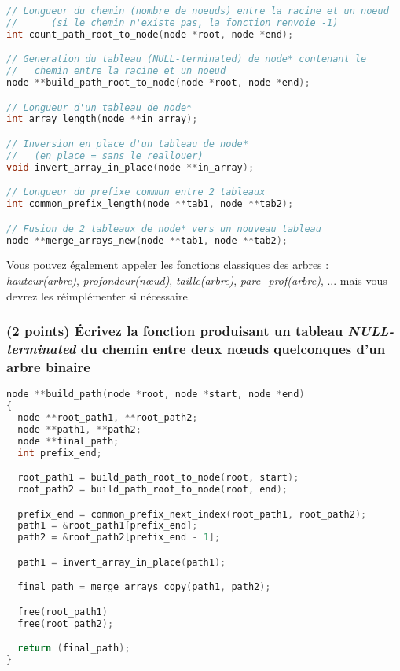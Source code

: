 \documentclass[11pt,a4paper]{article}
\begin{document}
\begin{center}
\begin{lstlisting}[language=C,commentstyle=\color{teal}\ttfamily,morekeywords={node}]
// Longueur du chemin (nombre de noeuds) entre la racine et un noeud
//      (si le chemin n'existe pas, la fonction renvoie -1)
int count_path_root_to_node(node *root, node *end);

// Generation du tableau (NULL-terminated) de node* contenant le
//   chemin entre la racine et un noeud
node **build_path_root_to_node(node *root, node *end);

// Longueur d'un tableau de node*
int array_length(node **in_array);

// Inversion en place d'un tableau de node*
//   (en place = sans le reallouer)
void invert_array_in_place(node **in_array);

// Longueur du prefixe commun entre 2 tableaux
int common_prefix_length(node **tab1, node **tab2);

// Fusion de 2 tableaux de node* vers un nouveau tableau
node **merge_arrays_new(node **tab1, node **tab2);
\end{lstlisting}
\end{center}


\noindent Vous pouvez également appeler les fonctions classiques des arbres : \textit{hauteur(arbre)}, \textit{profondeur(nœud)}, \textit{taille(arbre)}, \textit{parc\_prof(arbre)}, ... mais vous devrez les réimplémenter si nécessaire.


\clearpage


\subsubsection{(2 points) \'Ecrivez la fonction produisant un tableau \textit{NULL-terminated} du chemin entre deux nœuds quelconques d'un arbre binaire}

\begin{center}
\begin{lstlisting}[language=C,morekeywords={node}]
node **build_path(node *root, node *start, node *end)
{
  node **root_path1, **root_path2;
  node **path1, **path2;
  node **final_path;
  int prefix_end;

  root_path1 = build_path_root_to_node(root, start);
  root_path2 = build_path_root_to_node(root, end);

  prefix_end = common_prefix_next_index(root_path1, root_path2);
  path1 = &root_path1[prefix_end];
  path2 = &root_path2[prefix_end - 1];

  path1 = invert_array_in_place(path1);

  final_path = merge_arrays_copy(path1, path2);

  free(root_path1)
  free(root_path2);

  return (final_path);
}
\end{lstlisting}
\end{center}
\end{document}
